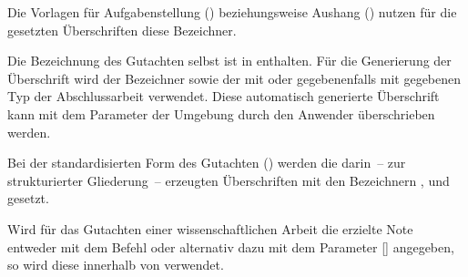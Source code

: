 \begin{Declaration*}{}
\begin{Declaration}{}
\begin{Declaration}{}
\printdeclarationlist%
%
Die Vorlagen für Aufgabenstellung () beziehungsweise Aushang 
() nutzen für die gesetzten Überschriften diese Bezeichner.
\end{Declaration}
\end{Declaration}

\begin{Declaration}{}
\begin{Declaration}{}
\printdeclarationlist%
%
Die Bezeichnung des Gutachten selbst ist in  enthalten. 
Für die Generierung der Überschrift wird der Bezeichner  
sowie der mit  oder gegebenenfalls mit  gegebenen 
Typ der Abschlussarbeit verwendet. Diese automatisch generierte Überschrift 
kann mit dem Parameter  der 
Umgebung  durch den Anwender überschrieben werden.
\end{Declaration}
\end{Declaration}

\begin{Declaration}{}
\begin{Declaration}{}
\printdeclarationlist%
%
Bei der standardisierten Form des Gutachten () werden die 
darin~-- zur strukturierter Gliederung~-- erzeugten Überschriften mit den 
Bezeichnern ,  und  
gesetzt.
\end{Declaration}
\end{Declaration}

\begin{Declaration}{}
\printdeclarationlist%
%
Wird für das Gutachten einer wissenschaftlichen Arbeit die erzielte Note 
entweder mit dem Befehl  oder alternativ dazu mit 
dem Parameter [] angegeben, so 
wird diese innerhalb von  verwendet.
\end{Declaration}


\end{Declaration*}
